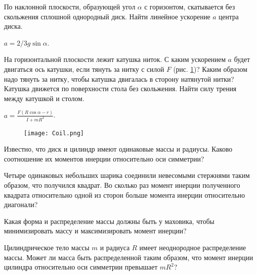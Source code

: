\begin{ex} %
По наклонной плоскости, образующей угол $\alpha$ с горизонтом, скатывается без скольжения сплошной однородный диск. Найти линейное ускорение $a$ центра диска.
\begin{ans}
$a=2/3g\sin \alpha$.
\end{ans}
\end{ex}	

\begin{ex} %
На горизонтальной плоскости лежит катушка ниток. С каким ускорением $a$ будет двигаться ось катушки, если тянуть за нитку с силой $F$ (рис. \ref{Coil})? Каким образом	надо тянуть за нитку, чтобы катушка двигалась в сторону натянутой нитки? Катушка движется по поверхности стола без скольжения. Найти силу трения между катушкой и столом.
\begin{ans}
$a = \frac{F(R\cos \alpha - r)}{I + mR^2}$.
\end{ans}
\end{ex}	

\begin{figure}
\centering
\texttt{[image: Coil.png]}
\caption{}
\label{Coil}
\end{figure}

\qualProblems

\begin{ex}
Известно, что диск и цилиндр имеют одинаковые массы и радиусы. Каково соотношение их моментов инерции относительно оси симметрии?
\end{ex}	

\begin{ex}
Четыре одинаковых небольших шарика соединили невесомыми стержнями таким образом, что получился квадрат. Во сколько раз момент инерции полученного квадрата относительно одной из сторон больше момента инерции относительно диагонали?
\end{ex}	

\begin{ex}
Какая форма и распределение массы должны быть у маховика, чтобы минимизировать массу и максимизировать момент инерции?
\end{ex}	

\begin{ex}
Цилиндрическое тело массы $m$ и радиуса $R$ имеет неоднородное распределение массы. Может ли масса быть распределенной таким образом, что момент инерции цилиндра относительно оси симметрии превышает $mR^2$? 
\end{ex}	

